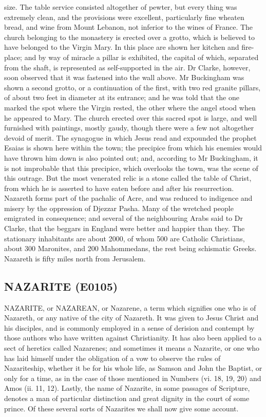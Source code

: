 \documentclass{article}
\begin{document}
size. The table service consisted altogether of pewter, but every thing was extremely clean, and the provisions were excellent, particularly fine wheaten bread, and wine from Mount Lebanon, not inferior to the wines of France. The church belonging to the monastery is erected over a grotto, which is believed to have belonged to the Virgin Mary. In this place are shown her kitchen and fire-place; and by way of miracle a pillar is exhibited, the capital of which, separated from the shaft, is represented as self-supported in the air. Dr Clarke, however, soon observed that it was fastened into the wall above. Mr Buckingham was shown a second grotto, or a continuation of the first, with two red granite pillars, of about two feet in diameter at its entrance; and he was told that the one marked the spot where the Virgin rested, the other where the angel stood when he appeared to Mary. The church erected over this sacred spot is large, and well furnished with paintings, mostly gaudy, though there were a few not altogether devoid of merit. The synagogue in which Jesus read and expounded the prophet Esaias is shown here within the town; the precipice from which his enemies would have thrown him down is also pointed out; and, according to Mr Buckingham, it is not improbable that this precipice, which overlooks the town, was the scene of this outrage. But the most venerated relic is a stone called the table of Christ, from which he is asserted to have eaten before and after his resurrection. Nazareth forms part of the pachalic of Acre, and was reduced to indigence and misery by the oppression of Djezzar Pasha. Many of the wretched people emigrated in consequence; and several of the neighbouring Arabs said to Dr Clarke, that the beggars in England were better and happier than they. The stationary inhabitants are about 2000, of whom 500 are Catholic Christians, about 300 Maronites, and 200 Mahommedans, the rest being schismatic Greeks. Nazareth is fifty miles north from Jerusalem.

\subsection*{NAZARITE (E0105)}
NAZARITE, or NAZAREAN, or Nazarene, a term which signifies one who is of Nazareth, or any native of the city of Nazareth. It was given to Jesus Christ and his disciples, and is commonly employed in a sense of derision and contempt by those authors who have written against Christianity. It has also been applied to a sect of heretics called Nazarenes; and sometimes it means a Nazarite, or one who has laid himself under the obligation of a vow to observe the rules of Nazariteship, whether it be for his whole life, as Samson and John the Baptist, or only for a time, as in the case of those mentioned in Numbers (vi. 18, 19, 20) and Amos (ii. 11, 12). Lastly, the name of Nazarite, in some passages of Scripture, denotes a man of particular distinction and great dignity in the court of some prince. Of these several sorts of Nazarites we shall now give some account.
\end{document}
